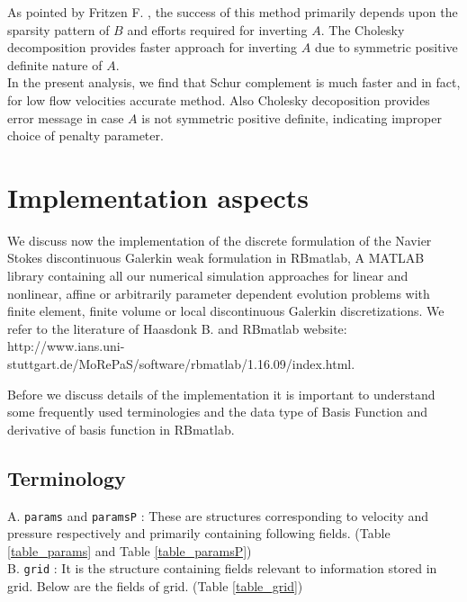 \documentclass[a4paper]{book}
\begin{document}
As pointed by Fritzen F. \cite{Fritzen}, the success of this method primarily depends upon the sparsity pattern of $B$ and efforts required for inverting $A$. The Cholesky decomposition provides faster approach for inverting $A$ due to symmetric positive definite nature of $A$. \\

In the present analysis, we find that Schur complement is much faster and in fact, for low flow velocities accurate method. Also Cholesky decoposition provides error message in case $A$ is not symmetric positive definite, indicating improper choice of penalty parameter. 

\chapter{Implementation aspects} \label{implementation_aspects}

We discuss now the implementation of the discrete formulation of the Navier Stokes discontinuous Galerkin weak formulation in RBmatlab, A MATLAB library containing all our numerical simulation approaches for linear and nonlinear, affine or arbitrarily parameter dependent evolution problems with finite element, finite volume or local discontinuous Galerkin discretizations. We refer to the literature of Haasdonk B.\cite{Haasdonk_book} and RBmatlab website: \linebreak http://www.ians.uni-stuttgart.de/MoRePaS/software/rbmatlab/1.16.09/\linebreak index.html.  

Before we discuss details of the implementation it is important to understand some frequently used terminologies and the data type of Basis Function and derivative of basis function in RBmatlab.
\section{Terminology}

A. \verb|params| and \verb|paramsP| : These are structures corresponding to velocity and pressure respectively and primarily containing following fields. (Table \ref{table_params} and Table \ref{table_paramsP})\\

B. \verb|grid| : It is the structure containing fields relevant to information stored in grid. Below are the fields of grid. (Table \ref{table_grid})\\
\end{document}
